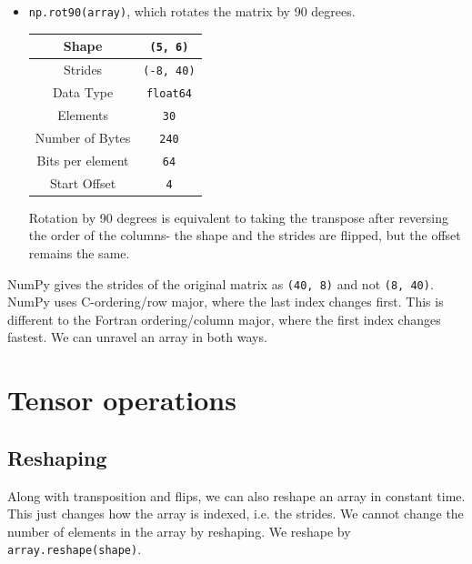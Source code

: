 \documentclass[a4paper, openany]{memoir}
\begin{document}
\begin{itemize}
        \item \texttt{np.rot90(array)}, which rotates the matrix by 90 degrees.
        \begin{table}[H]
            \centering
            \begin{tabular}{|c|c|}
                \hline
                Shape & \texttt{(5, 6)} \\
                \hline
                Strides & \texttt{(-8, 40)} \\
                \hline
                Data Type & \texttt{float64} \\
                \hline
                Elements & \texttt{30} \\
                \hline
                Number of Bytes & \texttt{240} \\
                \hline
                Bits per element & \texttt{64} \\
                \hline
                Start Offset & \texttt{4} \\
                \hline
            \end{tabular}
        \end{table}
        Rotation by 90 degrees is equivalent to taking the transpose after reversing the order of the columns- the shape and the strides are flipped, but the offset remains the same.
    \end{itemize}

    NumPy gives the strides of the original matrix as \texttt{(40, 8)} and not \texttt{(8, 40)}. NumPy uses C-ordering/row major, where the last index changes first. This is different to the Fortran ordering/column major, where the first index changes fastest. We can unravel an array in both ways. 
    
    \newpage

    \section{Tensor operations}
    \subsection{Reshaping}
    Along with transposition and flips, we can also reshape an array in constant time. This just changes how the array is indexed, i.e. the strides. We cannot change the number of elements in the array by reshaping. We reshape by \texttt{array.reshape(shape)}.
\end{document}

